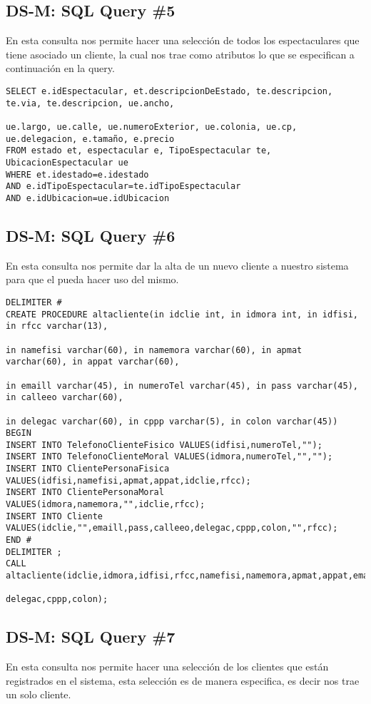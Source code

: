 \subsection{DS-M: SQL Query \#5}
En esta consulta nos permite hacer una selección de todos los espectaculares que tiene asociado un cliente, la cual nos trae como atributos lo que se especifican a continuación en la query.
\begin{verbatim}
SELECT e.idEspectacular, et.descripcionDeEstado, te.descripcion, te.via, te.descripcion, ue.ancho,

ue.largo, ue.calle, ue.numeroExterior, ue.colonia, ue.cp, ue.delegacion, e.tamaño, e.precio
FROM estado et, espectacular e, TipoEspectacular te, UbicacionEspectacular ue
WHERE et.idestado=e.idestado
AND e.idTipoEspectacular=te.idTipoEspectacular
AND e.idUbicacion=ue.idUbicacion
\end{verbatim}

\subsection{DS-M: SQL Query \#6}
En esta consulta nos permite dar la alta de un nuevo cliente a nuestro sistema para que el pueda hacer uso del mismo.
\begin{verbatim}
DELIMITER #
CREATE PROCEDURE altacliente(in idclie int, in idmora int, in idfisi, in rfcc varchar(13),

in namefisi varchar(60), in namemora varchar(60), in apmat varchar(60), in appat varchar(60),

in emaill varchar(45), in numeroTel varchar(45), in pass varchar(45), in calleeo varchar(60),

in delegac varchar(60), in cppp varchar(5), in colon varchar(45))
BEGIN
INSERT INTO TelefonoClienteFisico VALUES(idfisi,numeroTel,"");
INSERT INTO TelefonoClienteMoral VALUES(idmora,numeroTel,"","");
INSERT INTO ClientePersonaFisica VALUES(idfisi,namefisi,apmat,appat,idclie,rfcc);
INSERT INTO ClientePersonaMoral VALUES(idmora,namemora,"",idclie,rfcc);
INSERT INTO Cliente VALUES(idclie,"",emaill,pass,calleeo,delegac,cppp,colon,"",rfcc);
END #
DELIMITER ;
CALL altacliente(idclie,idmora,idfisi,rfcc,namefisi,namemora,apmat,appat,emaill,numeroTel,pass,calleeo,

delegac,cppp,colon);
\end{verbatim}


\subsection{DS-M: SQL Query \#7}
En esta consulta nos permite hacer una selección de los clientes que están registrados en el sistema, esta selección es de manera especifica, es decir nos trae un solo cliente.

